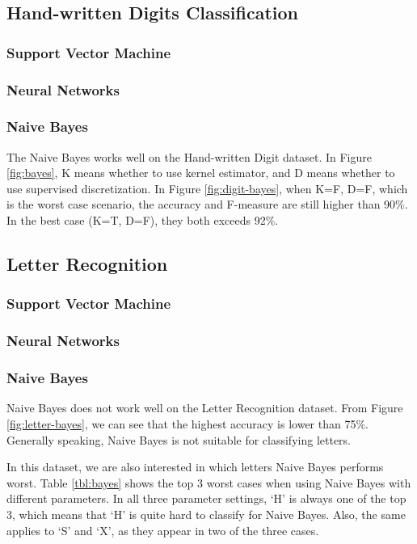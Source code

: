 \documentclass[11pt]{article}
\begin{document}
\subsection{Hand-written Digits Classification}
\subsubsection{Support Vector Machine}

\subsubsection{Neural Networks}

\subsubsection{Naive Bayes}
The Naive Bayes works well on the Hand-written Digit dataset. In Figure \ref{fig:bayes}, K means whether to use kernel estimator, and D means whether to use supervised discretization. In Figure \ref{fig:digit-bayes}, when K=F, D=F, which is the worst case scenario, the accuracy and F-measure are still higher than 90\%. In the best case (K=T, D=F), they both exceeds 92\%.


\subsection{Letter Recognition}
\subsubsection{Support Vector Machine}

\subsubsection{Neural Networks}

\subsubsection{Naive Bayes}
Naive Bayes does not work well on the Letter Recognition dataset. From Figure \ref{fig:letter-bayes}, we can see that the highest accuracy is lower than 75\%. Generally speaking, Naive Bayes is not suitable for classifying letters.

In this dataset, we are also interested in which letters Naive Bayes performs worst. Table \ref{tbl:bayes} shows the top 3 worst cases when using Naive Bayes with different parameters. In all three parameter settings, `H' is always one of the top 3, which means that `H' is quite hard to classify for Naive Bayes. Also, the same applies to `S' and `X', as they appear in two of the three cases.
\end{document}
